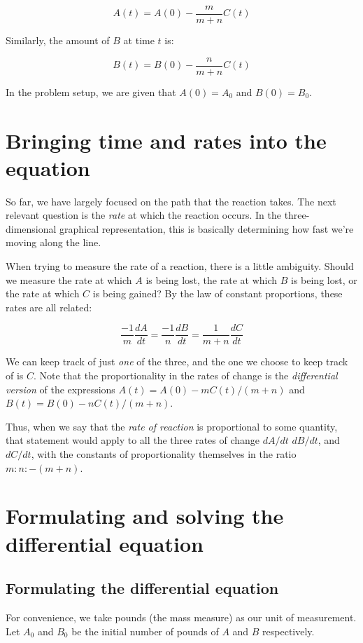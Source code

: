 \documentclass[10pt]{amsart}
\begin{document}
$$A(t) = A(0) - \frac{m}{m + n}C(t)$$

Similarly, the amount of $B$ at time $t$ is:

$$B(t) = B(0) - \frac{n}{m + n}C(t)$$

In the problem setup, we are given that $A(0) = A_0$ and $B(0) =
B_0$.

\section{Bringing time and rates into the equation}

So far, we have largely focused on the path that the reaction
takes. The next relevant question is the {\em rate} at which the
reaction occurs. In the three-dimensional graphical representation,
this is basically determining how fast we're moving along the line.

When trying to measure the rate of a reaction, there is a little
ambiguity. Should we measure the rate at which $A$ is being lost, the
rate at which $B$ is being lost, or the rate at which $C$ is being
gained? By the law of constant proportions, these rates are all related:

$$\frac{-1}{m} \frac{dA}{dt} = \frac{-1}{n} \frac{dB}{dt} = \frac{1}{m + n} \frac{dC}{dt}$$

We can keep track of just {\em one} of the three, and the one we
choose to keep track of is $C$. Note that the proportionality in the
rates of change is the {\em differential version} of the expressions
$A(t) = A(0) - mC(t)/(m + n)$ and $B(t) = B(0) - nC(t)/(m + n)$.

Thus, when we say that the {\em rate of reaction} is proportional to
some quantity, that statement would apply to all the three rates of
change $dA/dt$ $dB/dt$, and $dC/dt$, with the constants of
proportionality themselves in the ratio $m:n:-(m + n)$.

\section{Formulating and solving the differential equation}

\subsection{Formulating the differential equation}

For convenience, we take pounds (the mass measure) as our unit of
measurement. Let $A_0$ and $B_0$ be the initial number of pounds of
$A$ and $B$ respectively.
\end{document}
